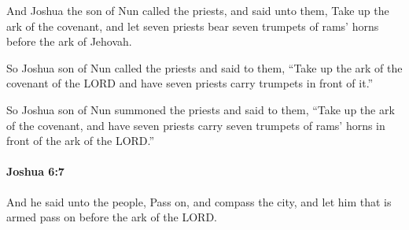 			\begin{versebox}
					\item[BHS] 
					\item[ASV] And Joshua the son of Nun called the priests, and said unto them, Take up the ark of the covenant, and let seven priests bear seven trumpets of rams' horns before the ark of Jehovah.
					\item[NIV] So Joshua son of Nun called the priests and said to them, “Take up the ark of the covenant of the LORD and have seven priests carry trumpets in front of it.”
					\item[NRSV] So Joshua son of Nun summoned the priests and said to them, “Take up the ark of the covenant, and have seven priests carry seven trumpets of rams’ horns in front of the ark of the LORD.”
			\end{versebox}

		\paragraph{Joshua 6:7} %
			\label{JOSHUA-6-7}

			And he said unto the people, Pass on, and compass the city, and let him that is armed pass on before the ark of the LORD.


